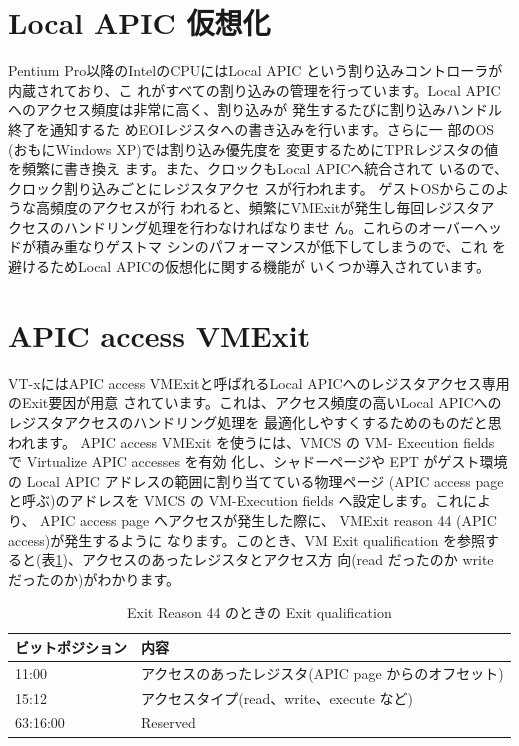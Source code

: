 \section{Local APIC 仮想化}

 Pentium Pro以降のIntelのCPUにはLocal APIC
という割り込みコントローラが内蔵されており、こ
れがすべての割り込みの管理を行っています。Local
APICへのアクセス頻度は非常に高く、割り込みが
発生するたびに割り込みハンドル終了を通知するた
めEOIレジスタへの書き込みを行います。さらに一
部のOS (おもにWindows XP)では割り込み優先度を
変更するためにTPRレジスタの値を頻繁に書き換え
ます。また、クロックもLocal APICへ統合されて
いるので、クロック割り込みごとにレジスタアクセ
スが行われます。
 ゲストOSからこのような高頻度のアクセスが行
われると、頻繁にVMExitが発生し毎回レジスタア
クセスのハンドリング処理を行わなければなりませ
ん。これらのオーバーヘッドが積み重なりゲストマ
シンのパフォーマンスが低下してしまうので、これ
を避けるためLocal APICの仮想化に関する機能が
いくつか導入されています。

\section{APIC access VMExit}

 VT-xにはAPIC access VMExitと呼ばれるLocal
APICへのレジスタアクセス専用のExit要因が用意
されています。これは、アクセス頻度の高いLocal
APICへのレジスタアクセスのハンドリング処理を
最適化しやすくするためのものだと思われます。
 APIC access VMExit を使うには、VMCS の VM-
Execution fields で Virtualize APIC accesses を有効
化し、シャドーページや EPT がゲスト環境の Local
APIC アドレスの範囲に割り当てている物理ページ
(APIC access page と呼ぶ)のアドレスを VMCS の
VM-Execution fields へ設定します。これにより、
APIC access page へアクセスが発生した際に、
VMExit reason 44 (APIC access)が発生するように
なります。このとき、VM Exit qualification を参照す
ると(表\ref{tab4})、アクセスのあったレジスタとアクセス方
向(read だったのか write だったのか)がわかります。

\begin{table}\centering
\begin{tabular}{|l|l|} \hline
ビットポジション & 内容 \\
\hline
11:00 & アクセスのあったレジスタ(APIC page からのオフセット) \\
\hline
15:12 & アクセスタイプ(read、write、execute など) \\
\hline
63:16:00 & Reserved \\
\hline

\end{tabular}
\caption{Exit Reason 44 のときの Exit qualification}
\label{tab4}

\end{table}

